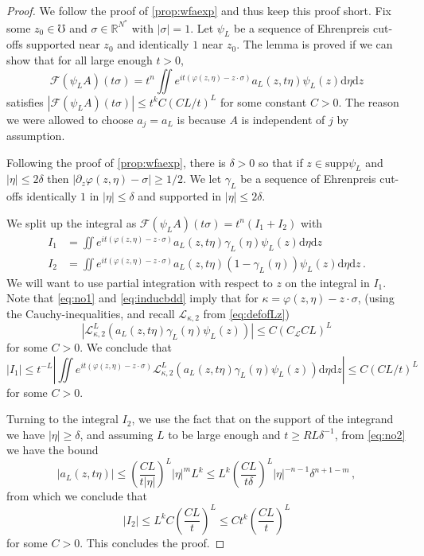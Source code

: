 \documentclass[
	fontsize=11pt, 
	twoside=false, 
	abstract=true, 
	a4paper,
]{scrartcl}
\newcommand{\RR}{\mathbb{R}}
\newcommand{\dd}{\mathrm{d}}
\newcommand{\abs}[1]{\left\lvert#1\right\rvert}
\newcommand{\del}{\partial}
\newcommand{\supp}{\mathrm{supp}}
\begin{document}
\begin{proof}
	We follow the proof of \cref{prop:wfaexp} and thus keep this proof short. Fix some $z_0 \in \mho$ and $\sigma \in \RR^{N^\ast}$ with $\abs{\sigma}=1$. Let $\psi_L$ be a sequence of Ehrenpreis cut-offs supported near $z_0$ and identically $1$ near $z_0$. The lemma is proved if we can show that for all large enough $t>0$,
	\[
		\mathcal{F}(\psi_L A)(t\sigma) = t^n\iint e^{it(\varphi(z,\eta)-z\cdot\sigma)}a_L(z,t\eta)\psi_L(z)\dd\eta\dd z
	\]
	satisfies $\abs{\mathcal{F}(\psi_L A)(t\sigma)} \leq t^k C(CL/t)^L$ for some constant $C>0$. The reason we were allowed to choose $a_j = a_L$ is because $A$ is independent of $j$ by assumption.

	Following the proof of \cref{prop:wfaexp}, there is $\delta>0$ so that if $z\in \supp \psi_L$ and $\abs{\eta}\leq 2\delta$ then $\abs{\del_z\varphi(z,\eta)-\sigma} \geq 1/2$. We let $\gamma_L$ be a sequence of Ehrenpreis cut-offs identically $1$ in $\abs{\eta} \leq \delta$ and supported in $\abs{\eta} \leq 2\delta$. 

	We split up the integral as $\mathcal{F}(\psi_L A)(t\sigma) = t^n(I_1+I_2)$ with 
	\begin{align*}
		I_1 &= 	\iint e^{it(\varphi(z,\eta)-z\cdot\sigma)}a_L(z,t\eta)\gamma_L(\eta)\psi_L(z)\dd\eta\dd z \\
		I_2 &= \iint e^{it(\varphi(z,\eta)-z\cdot\sigma)}a_L(z,t\eta)(1-\gamma_L(\eta))\psi_L(z)\dd\eta\dd z\,.
	\end{align*}
	We will want to use partial integration with respect to $z$ on the integral in $I_1$. Note that \cref{eq:no1} and \cref{eq:inducbdd} imply that for $\kappa = \varphi(z,\eta)-z\cdot \sigma$, (using the Cauchy-inequalities, and recall $\mathcal{L}_{\kappa,2}$ from \cref{eq:defofLz})
	\[
		\abs{\mathcal{L}_{\kappa,2}^L \left(a_L(z,t\eta)\gamma_L(\eta)\psi_L(z)\right)} \leq C (C_{\mathcal{L}} CL)^L
	\]
	for some $C>0$. We conclude that 
	\[
		\abs{I_1} \leq t^{-L} \abs{\iint e^{it(\varphi(z,\eta)-z\cdot\sigma)}\mathcal{L}_{\kappa,2}^L \left(a_L(z,t\eta)\gamma_L(\eta)\psi_L(z)\right)\dd\eta\dd z} \leq C(CL/t)^L
	\]
	for some $C>0$. 

	Turning to the integral $I_2$, we use the fact that on the support of the integrand we have $\abs{\eta}\geq \delta$, and assuming $L$ to be large enough and $t\geq RL\delta^{-1}$, from \cref{eq:no2} we have the bound
	\[
		\abs{a_L(z,t\eta)} \leq \left(\frac{CL}{t\abs{\eta}}\right)^L \abs{\eta}^m L^k \leq L^k \left(\frac{CL}{t\delta}\right)^L \abs{\eta}^{-n-1} \delta^{n+1-m}\,,
	\]
	from which we conclude that 
	\[
		\abs{I_2} \leq L^k C \left(\frac{CL}{t}\right)^L \leq C t^k \left(\frac{CL}{t}\right)^L
	\]
	for some $C>0$. This concludes the proof.
\end{proof}
\end{document}
